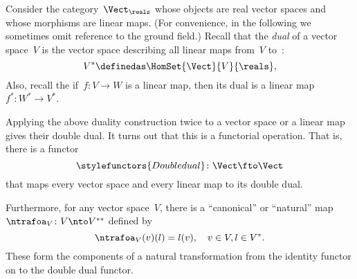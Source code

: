 \begin{example}\label{ex:Vect}
  Consider the category~$\Vect_{\reals}$ whose objects are real vector spaces and whose morphisms are linear maps. (For convenience, in the following we sometimes omit reference to the ground field.) Recall that the \emph{dual} of a vector space~$V$ is the vector space describing all linear maps from~$V$ to~\reals:
  \begin{equation*}
    V^* \definedas \HomSet{\Vect}{V}{\reals},
  \end{equation*}
  Also, recall the if~$f\colon V \to W$ is a linear map, then its dual is a linear map~$f^*\colon W^* \to V^*$.

  Applying the above duality construction twice to a vector space or a linear map gives their double dual. It turns out that this is a functorial operation. That is, there is a functor~
  \begin{equation*}
      \stylefunctors{Double dual}\colon \Vect \fto \Vect
  \end{equation*}
  that maps every vector space and every linear map to its double dual.

  Furthermore, for any vector space~$V$, there is a ``canonical'' or ``natural'' map~$\ntrafoa_V \colon V \nto V^{**}$ defined by
  \begin{equation*}
    \ntrafoa_V(v)(l) = l(v), \quad  v \in V, l \in V^*.
  \end{equation*}
  These form the components of a natural transformation from the identity functor on \Vect to the double dual functor.
  \begin{center}
  \end{center}
\end{example}



